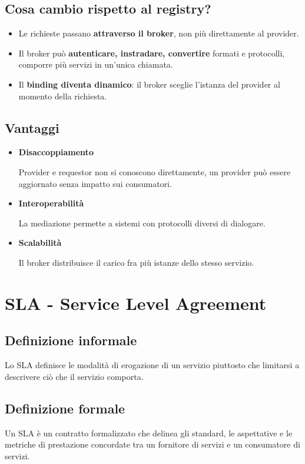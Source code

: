 \subsection{Cosa cambio rispetto al registry?}
\begin{itemize}
    \item Le richieste passano \textbf{attraverso il broker}, non più direttamente al provider.
    \item Il broker può \textbf{autenticare, instradare, convertire} formati e protocolli, comporre più servizi in un'unica chiamata.
    \item Il \textbf{binding diventa dinamico}: il broker sceglie l'istanza del provider al momento della richiesta.
\end{itemize}

\subsection{Vantaggi}
\begin{itemize}
    \item \textbf{Disaccoppiamento}

    Provider e requestor non si conoscono direttamente, un provider può essere aggiornato senza impatto sui consumatori.
    \item \textbf{Interoperabilità}

    La mediazione permette a sistemi con protocolli diversi di dialogare.
    \item \textbf{Scalabilità}

    Il broker distribuisce il carico fra più istanze dello stesso servizio.
\end{itemize}

\newpage

\section{SLA - Service Level Agreement}
\subsection{Definizione informale}
Lo SLA definisce le modalità di erogazione di un servizio piuttosto che limitarsi a descrivere ciò che il servizio comporta.

\subsection{Definizione formale}
Un SLA è un contratto formalizzato che delinea gli standard, le aspettative e le metriche di prestazione concordate tra un fornitore di servizi e un consumatore di servizi.

